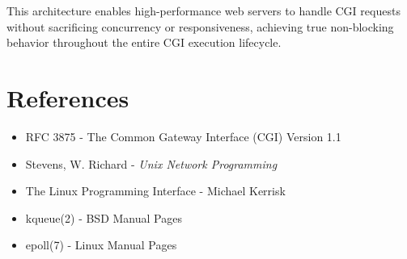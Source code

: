 \documentclass[12pt,a4paper]{article}
\begin{document}
This architecture enables high-performance web servers to handle CGI requests without sacrificing concurrency or responsiveness, achieving true non-blocking behavior throughout the entire CGI execution lifecycle.

\section{References}

\begin{itemize}
    \item RFC 3875 - The Common Gateway Interface (CGI) Version 1.1
    \item Stevens, W. Richard - \textit{Unix Network Programming}
    \item The Linux Programming Interface - Michael Kerrisk
    \item kqueue(2) - BSD Manual Pages
    \item epoll(7) - Linux Manual Pages
\end{itemize}
\end{document}

